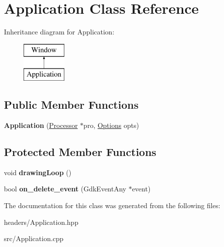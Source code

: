 \hypertarget{classApplication}{\section{Application Class Reference}
\label{classApplication}
}
Inheritance diagram for Application\-:\begin{figure}[H]
\begin{center}
\leavevmode
\includegraphics[height=2.000000cm]{classApplication}
\end{center}
\end{figure}
\subsection*{Public Member Functions}
\begin{DoxyCompactItemize}
\item 
\hypertarget{classApplication_a9ebed8021c5b7ebb5076371167d52b87}{{\bfseries Application} (\hyperlink{classProcessor}{Processor} $\ast$pro, \hyperlink{structOptions}{Options} opts)}\label{classApplication_a9ebed8021c5b7ebb5076371167d52b87}

\end{DoxyCompactItemize}
\subsection*{Protected Member Functions}
\begin{DoxyCompactItemize}
\item 
\hypertarget{classApplication_a29d82b42f3057ed83168b9b292608b97}{void {\bfseries drawing\-Loop} ()}\label{classApplication_a29d82b42f3057ed83168b9b292608b97}

\item 
\hypertarget{classApplication_a2a8493f4e82943b5958c8ac10c259746}{bool {\bfseries on\-\_\-delete\-\_\-event} (Gdk\-Event\-Any $\ast$event)}\label{classApplication_a2a8493f4e82943b5958c8ac10c259746}

\end{DoxyCompactItemize}


The documentation for this class was generated from the following files\-:\begin{DoxyCompactItemize}
\item 
headers/Application.\-hpp\item 
src/Application.\-cpp\end{DoxyCompactItemize}
